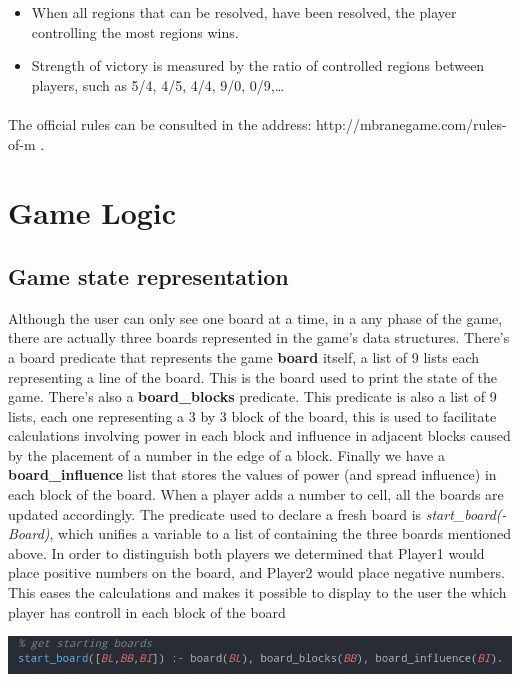 \documentclass[a4paper]{article}
\begin{document}
\begin{itemize}
    \item When all regions that can be resolved, have been resolved, the player controlling the most regions wins.
    \item Strength of victory is measured by the ratio of controlled regions between players, such as 5/4, 4/5, 4/4, 9/0, 0/9,\ldots
\end{itemize}

\paragraph{}
The official rules can be consulted in the address: http://mbranegame.com/rules-of-m \cite{Rules}.

\pagebreak
\section{Game Logic}

\subsection{Game state representation} 
Although the user can only see one board at a time, in a any phase of the game, there are actually three
boards represented in the game’s data structures. There’s a board predicate that represents the game \textbf{board} itself, a
list of 9 lists each representing a line of the board. This is the board used to print the state of the game. There’s 
also a \textbf{board\_blocks} predicate. This predicate is also a list of 9 lists, each one representing a 3 by 3 block of the 
board, this is used to facilitate calculations involving power in each block and influence in adjacent blocks caused 
by the placement of a number in the edge of a block. Finally we have a \textbf{board\_influence} list that stores the values of 
power (and spread influence) in each block of the board.  When a player adds a number to cell, all the boards are 
updated accordingly. The predicate used to declare a fresh board is \textit{start\_board(-Board)}, which unifies a variable to a list 
of containing the three boards mentioned above. In order to distinguish both players we determined that Player1 would place 
positive numbers on the board, and Player2 would place negative numbers. This eases the calculations and makes it possible 
to display to the user the which player has controll in each block of the board

\begin{center}
    \includegraphics[scale=0.3]{img/board.png}
\end{center}
\end{document}

